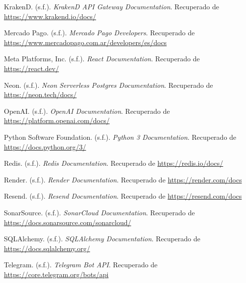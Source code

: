 \hangindent=1.25cm
KrakenD. (s.f.). \textit{KrakenD API Gateway Documentation}. Recuperado de \url{https://www.krakend.io/docs/}
\vspace{0.4cm}

\hangindent=1.25cm
Mercado Pago. (s.f.). \textit{Mercado Pago Developers}. Recuperado de \url{https://www.mercadopago.com.ar/developers/es/docs}
\vspace{0.4cm}

\hangindent=1.25cm
Meta Platforms, Inc. (s.f.). \textit{React Documentation}. Recuperado de \url{https://react.dev/}
\vspace{0.4cm}

\hangindent=1.25cm
Neon. (s.f.). \textit{Neon Serverless Postgres Documentation}. Recuperado de \url{https://neon.tech/docs/}
\vspace{0.4cm}

\hangindent=1.25cm
OpenAI. (s.f.). \textit{OpenAI Documentation}. Recuperado de \url{https://platform.openai.com/docs/}
\vspace{0.4cm}

\hangindent=1.25cm
Python Software Foundation. (s.f.). \textit{Python 3 Documentation}. Recuperado de \url{https://docs.python.org/3/}
\vspace{0.4cm}

\hangindent=1.25cm
Redis. (s.f.). \textit{Redis Documentation}. Recuperado de \url{https://redis.io/docs/}
\vspace{0.4cm}

\hangindent=1.25cm
Render. (s.f.). \textit{Render Documentation}. Recuperado de \url{https://render.com/docs}
\vspace{0.4cm}

\hangindent=1.25cm
Resend. (s.f.). \textit{Resend Documentation}. Recuperado de \url{https://resend.com/docs}
\vspace{0.4cm}

\hangindent=1.25cm
SonarSource. (s.f.). \textit{SonarCloud Documentation}. Recuperado de \url{https://docs.sonarsource.com/sonarcloud/}
\vspace{0.4cm}

\hangindent=1.25cm
SQLAlchemy. (s.f.). \textit{SQLAlchemy Documentation}. Recuperado de \url{https://docs.sqlalchemy.org/}
\vspace{0.4cm}

\hangindent=1.25cm
Telegram. (s.f.). \textit{Telegram Bot API}. Recuperado de \url{https://core.telegram.org/bots/api}
\vspace{0.4cm}

